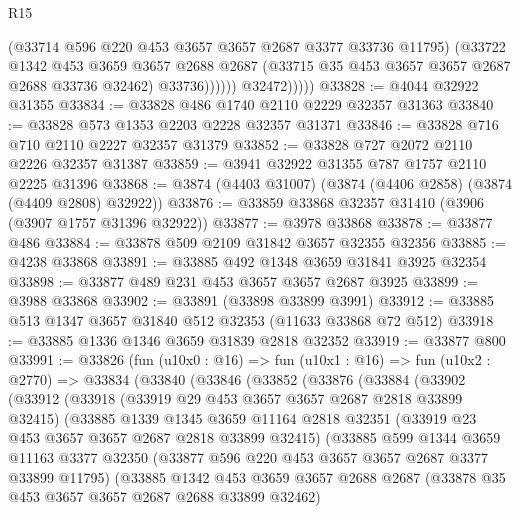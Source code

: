 \begin{lexlean}{R15}
\begin{coremodule}
                        (@33714 @596 @220 @453 @3657 @3657 @2687 @3377 @33736 @11795)
                        (@33722
                          @1342
                          @453
                          @3659
                          @3657
                          @2688
                          @2687
                          (@33715 @35 @453 @3657 @3657 @2687 @2688 @33736 @32462)
                          @33736))))))
              @32472)))))
@33828 := @4044 @32922 @31355
@33834 := @33828 @486 @1740 @2110 @2229 @32357 @31363
@33840 := @33828 @573 @1353 @2203 @2228 @32357 @31371
@33846 := @33828 @716 @710 @2110 @2227 @32357 @31379
@33852 := @33828 @727 @2072 @2110 @2226 @32357 @31387
@33859 := @3941 @32922 @31355 @787 @1757 @2110 @2225 @31396
@33868 := @3874 (@4403 @31007) (@3874 (@4406 @2858) (@3874 (@4409 @2808) @32922))
@33876 := @33859 @33868 @32357 @31410 (@3906 (@3907 @1757 @31396 @32922))
@33877 := @3978 @33868
@33878 := @33877 @486
@33884 := @33878 @509 @2109 @31842 @3657 @32355 @32356
@33885 := @4238 @33868
@33891 := @33885 @492 @1348 @3659 @31841 @3925 @32354
@33898 := @33877 @489 @231 @453 @3657 @3657 @2687 @3925
@33899 := @3988 @33868
@33902 := @33891 (@33898 @33899 @3991)
@33912 := @33885 @513 @1347 @3657 @31840 @512 @32353 (@11633 @33868 @72 @512)
@33918 := @33885 @1336 @1346 @3659 @31839 @2818 @32352
@33919 := @33877 @800
@33991 := @33826
    (fun (u10x0 : @16) =>
    fun (u10x1 : @16) =>
    fun (u10x2 : @2770) =>
    @33834
      (@33840
        (@33846
          (@33852
            (@33876
              (@33884
                (@33902
                  (@33912
                    (@33918
                      (@33919 @29 @453 @3657 @3657 @2687 @2818 @33899 @32415)
                      (@33885
                        @1339
                        @1345
                        @3659
                        @11164
                        @2818
                        @32351
                        (@33919 @23 @453 @3657 @3657 @2687 @2818 @33899 @32415)
                        (@33885
                          @599
                          @1344
                          @3659
                          @11163
                          @3377
                          @32350
                          (@33877 @596 @220 @453 @3657 @3657 @2687 @3377 @33899 @11795)
                          (@33885
                            @1342
                            @453
                            @3659
                            @3657
                            @2688
                            @2687
                            (@33878 @35 @453 @3657 @3657 @2687 @2688 @33899 @32462)

\end{coremodule}
\end{lexlean}
